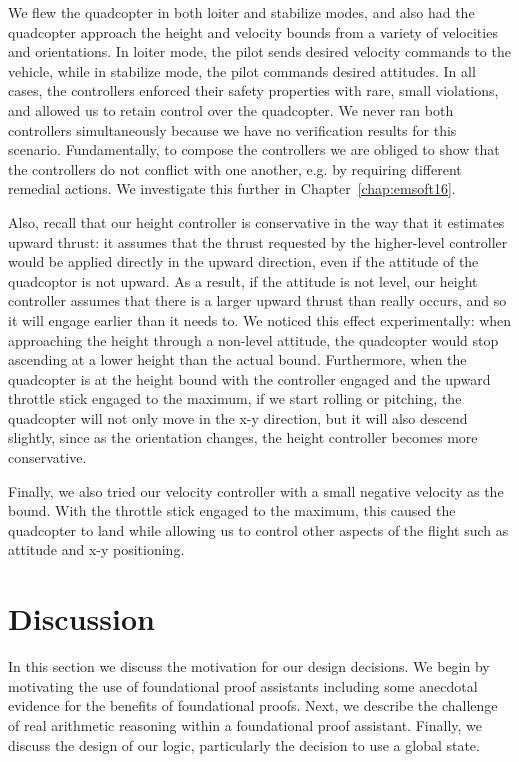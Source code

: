 We flew the quadcopter in both loiter and stabilize modes, and also had the
quadcopter approach the height and velocity bounds from a variety of
velocities and orientations. In loiter mode, the pilot sends desired
velocity commands to the vehicle, while in stabilize mode, the pilot
commands desired attitudes. In all cases, the controllers enforced their
safety properties with rare, small violations, and allowed us to retain
control over the quadcopter.  We never ran both controllers simultaneously
because we have no verification results for this scenario.  Fundamentally,
to compose the controllers we are obliged to show that the controllers do
not conflict with one another, e.g. by requiring different remedial
actions. We investigate this further in Chapter~\ref{chap:emsoft16}.

Also, recall that our height controller is conservative in the way that it
estimates upward thrust: it assumes that the thrust requested by the
higher-level controller would be applied directly in the upward direction,
even if the attitude of the quadcoptor is not upward.  As a result, if the
attitude is not level, our height controller assumes that there is a larger
upward thrust than really occurs, and so it will engage earlier than it
needs to.  We noticed this effect experimentally: when approaching the
height through a non-level attitude, the quadcopter would stop ascending at
a lower height than the actual bound.  Furthermore, when the quadcopter is
at the height bound with the controller engaged and the upward throttle
stick engaged to the maximum, if we start rolling or pitching, the
quadcopter will not only move in the x-y direction, but it will also
descend slightly, since as the orientation changes, the height controller
becomes more conservative.

Finally, we also tried our velocity controller with a small negative
velocity as the bound. With the throttle stick engaged to the maximum, this
caused the quadcopter to land while allowing us to control other aspects of
the flight such as attitude and x-y positioning.

\section{Discussion}
\label{sec:discussion}

In this section we discuss the motivation for our design decisions.  We
begin by motivating the use of foundational proof assistants including some
anecdotal evidence for the benefits of foundational proofs. Next, we
describe the challenge of real arithmetic reasoning within a foundational
proof assistant. Finally, we discuss the design of our logic, particularly
the decision to use a global state.

